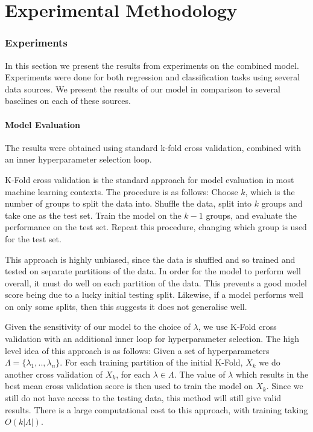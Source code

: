 \chapter{Experimental Methodology}
\label{cha:methodology}

\subsection{Experiments}
In this section we present the results from experiments on the combined model. Experiments were done for both regression and classification tasks using several data sources. We present the results of our model in comparison to several baselines on each of these sources. 

\subsubsection{Model Evaluation}
The results were obtained using standard k-fold cross validation, combined with an inner hyperparameter selection loop. 

K-Fold cross validation is the standard approach for model evaluation in most machine learning contexts. The procedure is as follows: Choose $k$, which is the number of groups to split the data into. Shuffle the data, split into $k$ groups and take one as the test set. Train the model on the $k-1$ groups, and evaluate the performance on the test set. Repeat this procedure, changing which group is used for the test set. 

This approach is highly unbiased, since the data is shuffled and so trained and tested on separate partitions of the data. In order for the model to perform well overall, it must do well on each partition of the data. This prevents a good model score being due to a lucky initial testing split. Likewise, if a model performs well on only some splits, then this suggests it does not generalise well.  

Given the sensitivity of our model to the choice of $\lambda$, we use K-Fold cross validation with an additional inner loop for hyperparameter selection. The high level idea of this approach is as follows: Given a set of hyperparameters $\Lambda = \{\lambda_1 ,.., \lambda_n\}$. For each training partition of the initial K-Fold, $X_k$ we do another cross validation of $X_k$, for each $\lambda \in \Lambda$. The value of $\lambda$ which results in the best mean cross validation score is then used to train the model on $X_k$. Since we still do not have access to the testing data, this method will still give valid results. There is a large computational cost to this approach, with training taking $O(k|\Lambda|)$.

